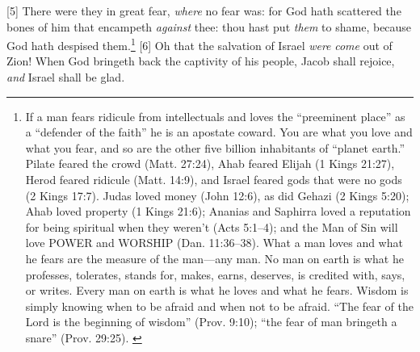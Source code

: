 [5] \textcolor[cmyk]{0.99998,1,0,0}{There were they in great fear, \emph{where} no fear was: for God hath scattered the bones of him that encampeth \emph{against} thee: thou hast put \emph{them} to shame, because God hath despised them.}\footnote{If a man fears ridicule from intellectuals and loves the “preeminent place” as a “defender of the faith” he is an apostate coward. You are what you love and what you fear, and so are the other five billion inhabitants of “planet earth.” Pilate feared the crowd (Matt. 27:24), Ahab feared Elijah (1 Kings 21:27), Herod feared ridicule (Matt. 14:9), and Israel feared gods that were no gods (2 Kings 17:7). Judas loved money (John 12:6), as did Gehazi (2 Kings 5:20); Ahab loved property (1 Kings 21:6); Ananias and Saphirra loved a reputation for being spiritual when they weren’t (Acts 5:1–4); and the Man of Sin will love POWER and WORSHIP (Dan. 11:36–38). What a man loves and what he fears are the measure of the man—any man. No man on earth is what he professes, tolerates, stands for, makes, earns, deserves, is credited with, says, or writes. Every man on earth is what he loves and what he fears. Wisdom is simply knowing when to be afraid and when not to be afraid. “The fear of the Lord is the beginning of wisdom” (Prov. 9:10); “the fear of man bringeth a snare” (Prov. 29:25). \cite{Ruckman1992Psalms}}
[6] \textcolor[cmyk]{0.99998,1,0,0}{Oh that the salvation of Israel \emph{were} \emph{come} out of Zion! When God bringeth back the captivity of his people, Jacob shall rejoice, \emph{and} Israel shall be glad.}


